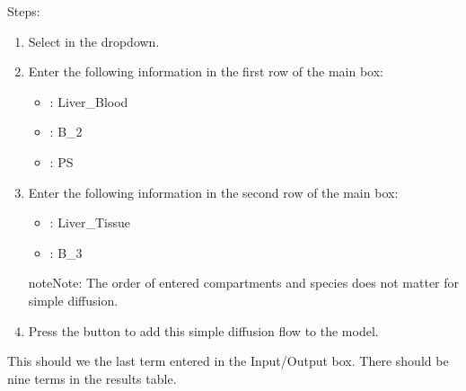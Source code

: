 \documentclass[letterpaper,10pt,english]{sphinxmanual}
\begin{document}
\sphinxAtStartPar
Steps:
\begin{enumerate}
%
\item {} 
\sphinxAtStartPar
Select  in the  dropdown.

\item {} 
\sphinxAtStartPar
Enter the following information in the first row of the main box:
\begin{itemize}
\item {} 
\sphinxAtStartPar
{}: Liver\_Blood

\item {} 
\sphinxAtStartPar
{}: B\_2

\item {} 
\sphinxAtStartPar
{}: PS

\end{itemize}

\item {} 
\sphinxAtStartPar
Enter the following information in the second row of the main box:
\begin{itemize}
\item {} 
\sphinxAtStartPar
{}: Liver\_Tissue

\item {} 
\sphinxAtStartPar
{}: B\_3

\end{itemize}

\begin{sphinxadmonition}{note}{Note:}
\sphinxAtStartPar
The order of entered compartments and species does not matter for
simple diffusion.
\end{sphinxadmonition}

\item {} 
\sphinxAtStartPar
Press the  button to add this simple diffusion flow to the model.

\end{enumerate}

\begin{figure}[htbp]
\centering

\noindent{}
\end{figure}

\sphinxAtStartPar
This should we the last term entered in the Input/Output box. There should be
nine terms in the results table.
\end{document}
